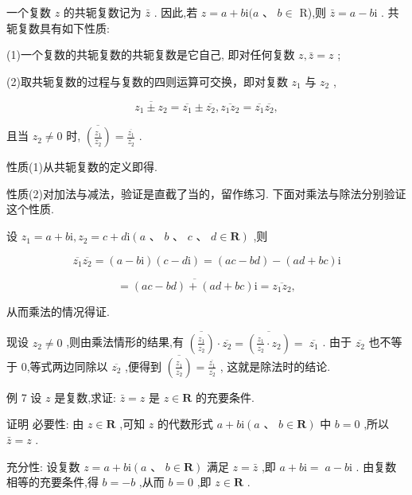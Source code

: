 \documentclass[10pt]{article}
\begin{document}
一个复数 \(z\) 的共轭复数记为 \(\bar{z}\) . 因此,若 \(z = a + b\mathrm{i}(a\text{ 、 }b \in\) R),则 \(\bar{z} = a - b\mathrm{i}\) . 共轭复数具有如下性质:

(1)一个复数的共轭复数的共轭复数是它自己, 即对任何复数 \(z,\bar{z} = z\) ;

(2)取共轭复数的过程与复数的四则运算可交换，即对复数 \({z}_{1}\) 与 \({z}_{2}\) ,

\[
\overline{{z}_{1} \pm  {z}_{2}} = \overline{{z}_{1}} \pm  \overline{{z}_{2}},\overline{{z}_{1}{z}_{2}} = \overline{{z}_{1}}\overline{{z}_{2}},
\]

且当 \({z}_{2} \neq  0\) 时, \(\overline{\left( \frac{{z}_{1}}{{z}_{2}}\right) } = \frac{\overline{{z}_{1}}}{\overline{{z}_{2}}}\) .

性质(1)从共轭复数的定义即得.

性质(2)对加法与减法，验证是直截了当的，留作练习. 下面对乘法与除法分别验证这个性质.

设 \({z}_{1} = a + b\mathrm{i},{z}_{2} = c + d\mathrm{i}\left( {a\text{ 、 }b\text{ 、 }c\text{ 、 }d \in  \mathbf{R}}\right)\) ,则

\[
\overline{{z}_{1}}\overline{{z}_{2}} = \left( {a - b\mathrm{i}}\right) \left( {c - d\mathrm{i}}\right)  = \left( {{ac} - {bd}}\right)  - \left( {{ad} + {bc}}\right) \mathrm{i}
\]

\[
= \overline{\left( {{ac} - {bd}}\right)  + \left( {{ad} + {bc}}\right) \mathrm{i}} = \overline{{z}_{1}{z}_{2}},
\]

从而乘法的情况得证.

现设 \({z}_{2} \neq  0\) ,则由乘法情形的结果,有 \(\overline{\left( \frac{{z}_{1}}{{z}_{2}}\right) } \cdot  \overline{{z}_{2}} = \overline{\left( \frac{{z}_{1}}{{z}_{2}} \cdot  {z}_{2}\right) } = \; \overline{{z}_{1}}\) . 由于 \(\overline{{z}_{2}}\) 也不等于 0,等式两边同除以 \(\overline{{z}_{2}}\) ,便得到 \(\overline{\left( \frac{{z}_{1}}{{z}_{2}}\right) } = \frac{\overline{{z}_{1}}}{\overline{{z}_{2}}}\) , 这就是除法时的结论.

例 7 设 \(z\) 是复数,求证: \(\bar{z} = z\) 是 \(z \in  \mathbf{R}\) 的充要条件.

证明 必要性: 由 \(z \in  \mathbf{R}\) ,可知 \(z\) 的代数形式 \(a + b\mathrm{i}\left( {a\text{ 、 }b \in  \mathbf{R}}\right)\) 中 \(b = 0\) ,所以 \(\bar{z} = z\) .

充分性: 设复数 \(z = a + b\mathrm{i}\left( {a\text{ 、 }b \in  \mathbf{R}}\right)\) 满足 \(z = \bar{z}\) ,即 \(a + b\mathrm{i} = \; a - b\mathrm{i}\) . 由复数相等的充要条件,得 \(b =  - b\) ,从而 \(b = 0\) ,即 \(z \in  \mathbf{R}\) .
\end{document}

